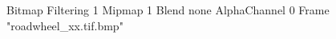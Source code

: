 {Bitmap
	{Filtering 1}
	{Mipmap 1}
	{Blend none}
	{AlphaChannel 0}
	{Frame "roadwheel_xx.tif.bmp"}
}
